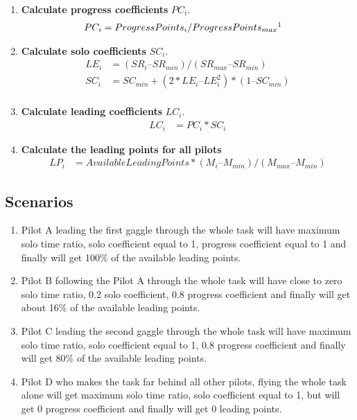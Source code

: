 \documentclass[gap.tex]{subfiles}
\begin{document}
\begin{enumerate}
    \item \textbf{Calculate progress coefficients} \(PC_i\).
        \begin{align*}
            PC_i &= ProgressPoints_i / ProgressPoints_{max}\footnotemark
        \end{align*}

    \item \textbf{Calculate solo coefficients} \(SC_i\).
        \begin{align*}
            LE_i &= (SR_i – SR_{min}) / (SR_{max} – SR_{min}) \\
            SC_i &= SC_{min} + (2*LE_i – LE_i^2) * (1 – SC_{min}) \\
        \end{align*}
            
    \item \textbf{Calculate leading coefficients} \(LC_i\).
        \begin{align*}
            LC_i &= PC_i * SC_i
        \end{align*}
            
    \item \textbf{Calculate the leading points for all pilots}
        \begin{align*}
            LP_i &= AvailableLeadingPoints * (M_i – M_{min}) / (M_{max} – M_{min} )
        \end{align*}
\end{enumerate}

\newpage
\subsection{Scenarios}

\begin{enumerate}
    \item Pilot A leading the first gaggle through the whole task will have
        maximum solo time ratio, solo coefficient equal to 1, progress
        coefficient equal to 1 and finally will get 100\% of the available
        leading points.

    \item Pilot B following the Pilot A through the whole task will have close
        to zero solo time ratio, 0.2 solo coefficient, 0.8 progress coefficient
        and finally will get about 16\% of the available leading points.

    \item Pilot C leading the second gaggle through the whole task will have
        maximum solo time ratio, solo coefficient equal to 1, 0.8 progress
        coefficient and finally will get 80\% of the available leading points.

    \item Pilot D who makes the task far behind all other pilots, flying the
        whole task alone will get maximum solo time ratio, solo coefficient
        equal to 1, but will get 0 progress coefficient and finally will get
        0 leading points.
\end{enumerate}
\end{document}
